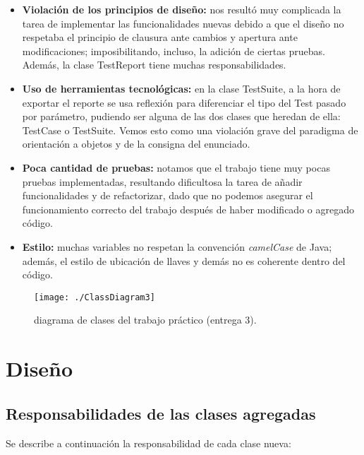 \documentclass[12pt]{article}
\begin{document}
\begin{itemize}
\begin{itemize}
		\end{itemize}	
		
	\item \textbf{Violación de los principios de diseño:} nos resultó muy complicada la tarea de implementar 
		las funcionalidades nuevas debido a que el diseño no respetaba el principio de clausura ante 
		cambios y apertura ante modificaciones; imposibilitando, incluso, la adición de ciertas pruebas. 
		Además, la clase TestReport tiene muchas responsabilidades.	

	\item \textbf{Uso de herramientas tecnológicas:} en la clase TestSuite, a la hora de exportar
		el reporte se usa reflexión para diferenciar el tipo del Test pasado por parámetro,
		pudiendo ser alguna de las dos clases que heredan de ella: TestCase o TestSuite.
		Vemos esto como una violación grave del paradigma de orientación a objetos y de la
		consigna del enunciado.
	
	\item \textbf{Poca cantidad de pruebas:} notamos que el trabajo tiene muy pocas pruebas
		implementadas, resultando dificultosa la tarea de añadir funcionalidades y
		de refactorizar, dado que no podemos asegurar el funcionamiento correcto del trabajo
		después de haber modificado o agregado código.
		
	\item \textbf{Estilo:} muchas variables no respetan la convención \textit{camelCase} 
		de Java; además, el estilo de ubicación de llaves y demás no es coherente dentro del
		código.
		
\end{itemize}


\begin{figure}[h!]
\begin{center}
	\texttt{[image: ./ClassDiagram3]}
\end{center}
	\caption{diagrama de clases del trabajo práctico (entrega 3).}
\end{figure}

	
\section{Diseño}

\subsection{Responsabilidades de las clases agregadas}
Se describe a continuación la responsabilidad de cada clase nueva:
\begin{itemize}
\end{itemize}
\end{document}
